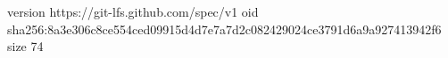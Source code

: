 version https://git-lfs.github.com/spec/v1
oid sha256:8a3e306c8ce554ced09915d4d7e7a7d2c082429024ce3791d6a9a927413942f6
size 74

